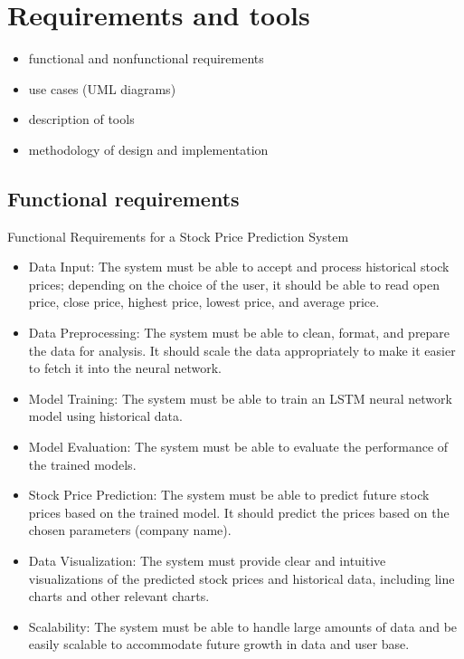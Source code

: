 \chapter{Requirements and tools}

\begin{itemize}
\item functional and nonfunctional requirements
\item use cases (UML diagrams)
\item description of tools
\item methodology of design and implementation
\end{itemize} 

\section*{Functional requirements}
Functional Requirements for a Stock Price Prediction System
\begin{itemize}
    \item Data Input: The system must be able to accept and process historical stock prices; depending on the choice of the user, it should be able to read open price, close price, highest price, lowest price, and average price.
    \item Data Preprocessing: The system must be able to clean, format, and prepare the data for analysis. It should scale the data appropriately to make it easier to fetch it into the neural network.
    \item Model Training: The system must be able to train an LSTM neural network model using historical data.
    \item Model Evaluation: The system must be able to evaluate the performance of the trained models.
    \item Stock Price Prediction: The system must be able to predict future stock prices based on the trained model. It should predict the prices based on the chosen parameters (company name).
    \item Data Visualization: The system must provide clear and intuitive visualizations of the predicted stock prices and historical data, including line charts and other relevant charts.
    \item Scalability: The system must be able to handle large amounts of data and be easily scalable to accommodate future growth in data and user base.
\end{itemize} 

